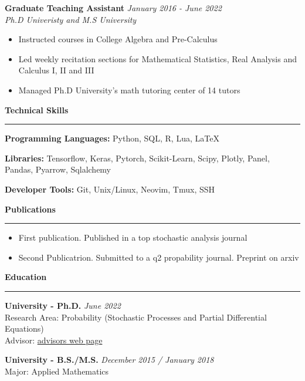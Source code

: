 \documentclass[11pt]{article}
\begin{document}
\textbf{\large Graduate Teaching Assistant}  \hfill \textit{January 2016 - June 2022} \\
\textit{Ph.D Univeristy and M.S University}
\begin{itemize} \setlength\itemsep{-0.5em}
  \item  Instructed courses in College Algebra and Pre-Calculus
  \item  Led weekly recitation sections for Mathematical Statistics, Real Analysis
  and Calculus I, II and III
  \item Managed Ph.D University's math tutoring center of 14 tutors
\end{itemize}

\vspace{.3em}
\textbf{\Large Technical Skills}
\vspace{.3em}
\hrule
\vspace{.3em}

\textbf{Programming Languages:}
Python, SQL, R, Lua, \LaTeX

\textbf{Libraries:} Tensorflow, Keras, Pytorch, Scikit-Learn, Scipy, Plotly, Panel, 
Pandas, Pyarrow, Sqlalchemy 

\textbf{Developer Tools:} Git, Unix/Linux, Neovim, Tmux, SSH

\vspace{.3em}
\textbf{\Large Publications}
\vspace{.3em}
\hrule
\vspace{.3em}

\begin{itemize}[leftmargin=*]
  \item[1:] First publication. Published in a top stochastic analysis journal 

  \item[2:] Second Publicatrion. Submitted to a q2 propability journal. Preprint on arxiv
\end{itemize}

\vspace{.3em}
\textbf{\Large Education}
\vspace{.3em}
\hrule
\vspace{.3em}


\textbf{University - Ph.D.} \hfill \textit{June 2022} \\
Research Area: Probability (Stochastic Processes and Partial Differential Equations) \\
Advisor: \href{http://univ.edu/}{advisors web page}

\textbf{University - B.S./M.S.} \hfill \textit{December 2015 / January 2018} \\
Major: Applied Mathematics \\
\end{document}
